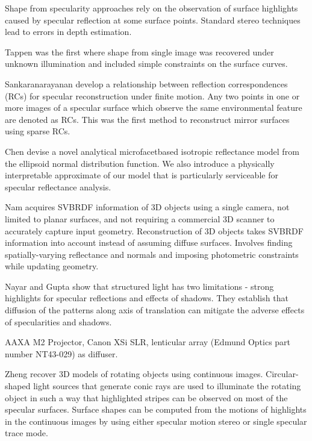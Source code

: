 Shape from specularity approaches rely on the observation of surface highlights caused by specular reflection at some surface points. Standard stereo techniques lead to errors in depth estimation.

\dagg Tappen \cite{tappen2011recovering} was the first where shape from single image was recovered under unknown illumination and included simple constraints on the surface curves. 

\dagg Sankaranarayanan \etal \cite{sankaranarayanan2010specular} develop a relationship between reflection correspondences (RCs) for specular reconstruction under finite motion. Any two points in one or more images of a specular surface which observe the same environmental feature are denoted as RCs. This was the first method to reconstruct mirror surfaces using sparse RCs. 

\dagg Chen \etal \cite{chen2017microfacet} devise a novel analytical microfacetbased isotropic reflectance model from the ellipsoid normal distribution function. We also introduce a physically interpretable approximate of our model that is particularly serviceable for specular reflectance analysis. 

\dagg Nam \etal \cite{nam2018practical} acquires SVBRDF information of 3D objects using a single camera, not limited to planar surfaces, and not requiring a commercial 3D scanner to accurately capture input geometry. Reconstruction of 3D objects takes SVBRDF information into account instead of assuming diffuse surfaces. Involves finding spatially-varying reflectance and normals and imposing photometric constraints while updating geometry.

\dagg Nayar and Gupta \cite{nayar2012diffuse} show that structured light has two limitations - strong highlights for specular reflections and effects of shadows. They establish that diffusion of the patterns along axis of translation can mitigate the adverse effects of specularities and shadows.

\hardware AAXA M2 Projector, Canon XSi SLR, lenticular array (Edmund Optics part number NT43-029) as diffuser. 

\dagg Zheng \etal \cite{zheng2000acquiring} recover 3D models of rotating objects using continuous images.  Circular-shaped light sources that generate conic rays are used to illuminate the rotating object in such a way that highlighted stripes can be observed on most of the specular surfaces. Surface shapes can be computed from the motions of highlights in the continuous images by using either specular motion stereo or single specular trace mode.

